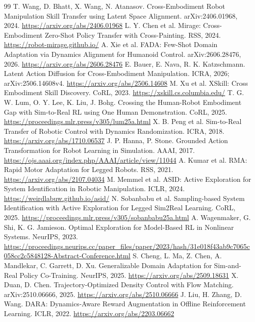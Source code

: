 \documentclass[11pt]{article}
\begin{document}
\begin{thebibliography}{99}
\small
{} T. Wang, D. Bhatt, X. Wang, N. Atanasov. Cross-Embodiment Robot Manipulation Skill Transfer using Latent Space Alignment. arXiv:2406.01968, 2024. \url{https://arxiv.org/abs/2406.01968}
 L. Y. Chen et al. Mirage: Cross-Embodiment Zero-Shot Policy Transfer with Cross-Painting. RSS, 2024. \url{https://robot-mirage.github.io/}
 A. Xie et al. FADA: Few-Shot Domain Adaptation via Dynamics Alignment for Humanoid Control. arXiv:2606.28476, 2026. \url{https://arxiv.org/abs/2606.28476}
 E. Bauer, E. Nava, R. K. Katzschmann. Latent Action Diffusion for Cross-Embodiment Manipulation. ICRA, 2026; arXiv:2506.14608v4. \url{https://arxiv.org/abs/2506.14608}
 M. Xu et al. XSkill: Cross Embodiment Skill Discovery. CoRL, 2023. \url{https://xskill.cs.columbia.edu/}
 T. G. W. Lum, O. Y. Lee, K. Liu, J. Bohg. Crossing the Human-Robot Embodiment Gap with Sim-to-Real RL using One Human Demonstration. CoRL, 2025. \url{https://proceedings.mlr.press/v305/lum25a.html}
 X. B. Peng et al. Sim-to-Real Transfer of Robotic Control with Dynamics Randomization. ICRA, 2018. \url{https://arxiv.org/abs/1710.06537}
 J. P. Hanna, P. Stone. Grounded Action Transformation for Robot Learning in Simulation. AAAI, 2017. \url{https://ojs.aaai.org/index.php/AAAI/article/view/11044}
 A. Kumar et al. RMA: Rapid Motor Adaptation for Legged Robots. RSS, 2021. \url{https://arxiv.org/abs/2107.04034}
 M. Memmel et al. ASID: Active Exploration for System Identification in Robotic Manipulation. ICLR, 2024. \url{https://weirdlabuw.github.io/asid/}
 N. Sobanbabu et al. Sampling-based System Identification with Active Exploration for Legged Sim2Real Learning. CoRL, 2025. \url{https://proceedings.mlr.press/v305/sobanbabu25a.html}
 A. Wagenmaker, G. Shi, K. G. Jamieson. Optimal Exploration for Model-Based RL in Nonlinear Systems. NeurIPS, 2023. \url{https://proceedings.neurips.cc/paper_files/paper/2023/hash/31e018f43ab9c7065c058cc2c5848128-Abstract-Conference.html}
 S. Cheng, L. Ma, Z. Chen, A. Mandlekar, C. Garrett, D. Xu. Generalizable Domain Adaptation for Sim-and-Real Policy Co-Training. NeurIPS, 2025. \url{https://arxiv.org/abs/2509.18631}
 X. Duan, D. Chen. Trajectory-Optimized Density Control with Flow Matching. arXiv:2510.06666, 2025. \url{https://arxiv.org/abs/2510.06666}
 J. Liu, H. Zhang, D. Wang. DARA: Dynamics-Aware Reward Augmentation in Offline Reinforcement Learning. ICLR, 2022. \url{https://arxiv.org/abs/2203.06662}

\end{thebibliography}
\end{document}
